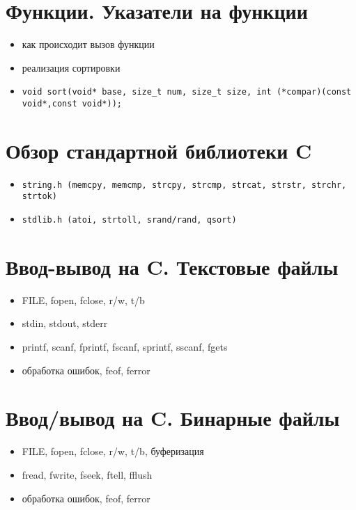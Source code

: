 \section{Функции. Указатели на функции}
\begin{itemize}
    \item как происходит вызов функции
    \item реализация сортировки
    \item \begin{verbatim}void sort(void* base, size_t num, size_t size, int (*compar)(const void*,const void*));\end{verbatim}
\end{itemize}
\section{Обзор стандартной библиотеки C}
\begin{itemize}
    \item \begin{verbatim}string.h (memcpy, memcmp, strcpy, strcmp, strcat, strstr, strchr, strtok)\end{verbatim}
    \item \begin{verbatim}stdlib.h (atoi, strtoll, srand/rand, qsort)\end{verbatim}
\end{itemize}
\section{Ввод-вывод на C. Текстовые файлы}
\begin{itemize}
    \item FILE, fopen, fclose, r/w, t/b
    \item stdin, stdout, stderr
    \item printf, scanf, fprintf, fscanf, sprintf, sscanf, fgets
    \item обработка ошибок, feof, ferror
\end{itemize}
\section{Ввод/вывод на C. Бинарные файлы}
\begin{itemize}
    \item FILE, fopen, fclose, r/w, t/b, буферизация
    \item fread, fwrite, fseek, ftell, fflush
    \item обработка ошибок, feof, ferror
\end{itemize}
